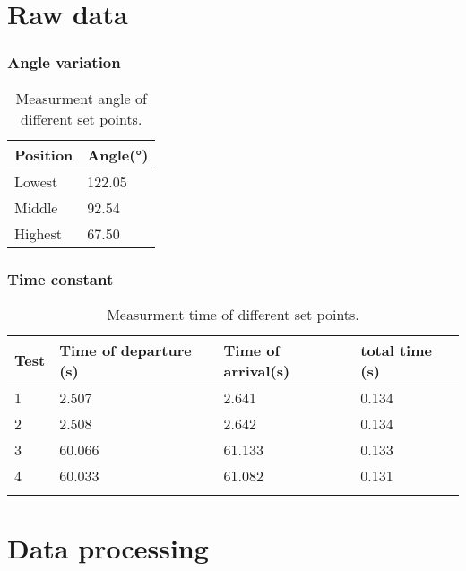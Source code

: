 	\section*{Raw data}
	
		\subsubsection*{Angle variation}

\begin{table}[htbp]
	\centering
	\caption{Measurment angle of different set points.}
	\label{RPMData}
	\begin{tabular}{ll}
		Position & Angle{(}°{)}  \\ \hline  \rowcolor{lightGrey}
		Lowest      &  122.05                      \\
		Middle      & 92.54  \\  \rowcolor{lightGrey}
		Highest      & 67.50 \\              
	\end{tabular}
\end{table}

		\subsubsection*{Time constant}

\begin{table}[htbp]
	\centering
	\caption{Measurment time of different set points.}
	\label{RPMData}
	\begin{tabular}{llll}
		Test & Time of departure {(}s{)}& Time of arrival{(}s{)} & total time {(}s{)} \\ \hline  \rowcolor{lightGrey}
		1     & 2.507              & 2.641             & 0.134                     \\
		2     & 2.508              & 2.642 & 0.134                                 \\  \rowcolor{lightGrey}
		3     & 60.066              & 61.133 & 0.133                                 \\ 
		4     & 60.033             & 61.082            & 0.131                    \\  \rowcolor{lightGrey}             
	\end{tabular}
\end{table}


	\section*{Data processing}	
	
